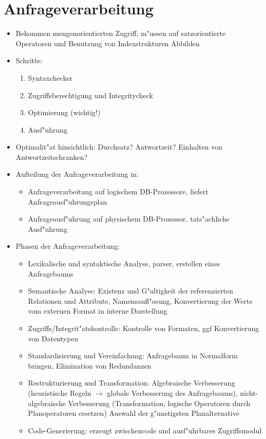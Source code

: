 \documentclass[a4paper, 12pt]{scrartcl}
\begin{document}
\section{Anfrageverarbeitung}
\begin{itemize}
	\item
		Bekommen mengenorientierten Zugriff, m"ussen auf satzorientierte Operatoren und Benutzung von Indexstrukturen Abbilden
	\item
		Schritte:
		\begin{enumerate}
			\item
				Syntaxchecker
			\item
				Zugriffsberechtigung und Integritycheck
			\item
				Optimierung (wichtig!)
			\item
				Ausf"uhrung
		\end{enumerate}
	\item
		Optimalit"at hinsichtlich: Durchsatz? Antwortzeit? Einhalten von Antwortzeitschranken?
	\item
		Aufteilung der Anfrageverarbeitung in:
		\begin{itemize}
			\item
				Anfrageverarbeitung auf logischem DB-Prozessore, liefert Anfrageausf"uhrungsplan
			\item
				Anfrageausf"uhrung auf physischem DB-Prozessor, tats"achliche Ausf"uhrung
		\end{itemize}

	\item
		Phasen der Anfrageverarbeitung:
		\begin{itemize}
			\item
				Lexikalische und syntaktische Analyse, parser, erstellen eines Anfragebaums
			\item
				Semantische Analyse: Existenz und G"ultigkeit der referenzierten Relationen und Attribute, Namensaufl"osung, Konvertierung der Werte vom externen Format in interne Darstellung
			\item
				Zugriffs/Integrit"atskontrolle: Kontrolle von Formaten, ggf Konvertierung von Datentypen
			\item
				Standardisierung und Vereinfachung: Anfragebaum in Normalform bringen, Elimination von Redundanzen
			\item
				Restrukturierung und Transformation: Algebraische Verbesserung (heuristische Regeln $\rightarrow$ globale Verbesserung des Anfragebaums), nicht-algebraische Verbesserung (Transformation, logische Operatoren durch Planoperatoren ersetzen) Auswahl der g"unstigsten Planalternative
			\item
				Code-Generierung: erzeugt zwischencode und ausf"uhrbares Zugriffsmodul

		\end{itemize}

\end{itemize}
\end{document}
